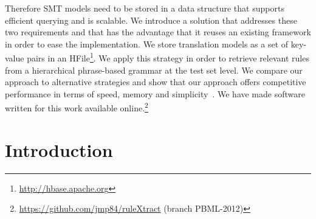Therefore SMT models need to be stored in a data structure
that supports efficient querying and is scalable. We introduce a solution
that addresses these two requirements and that has the advantage that
it reuses an existing framework in order to ease the implementation.
We store translation models as a set of key-value pairs in an
HFile\footnote{\url{http://hbase.apache.org}}. We apply this
strategy in order to retrieve relevant rules
from a hierarchical phrase-based grammar at the test set level. We compare our
approach to alternative strategies and show that our approach
offers competitive performance in terms
of speed, memory and simplicity~\citep{pino-waite-byrne:2012:PBML}. We
have made software written
for this work
available online.\footnote{\url{https://github.com/jmp84/ruleXtract} (branch PBML-2012)}

\section{Introduction}
\label{sec:hfileIntro}

